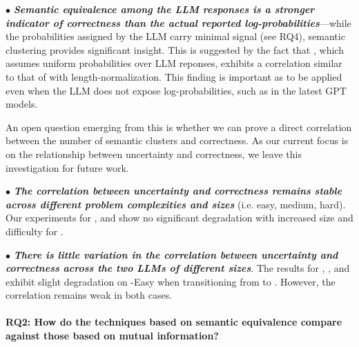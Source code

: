 $\bullet$ \emph{\textbf{Semantic equivalence among the LLM responses is a stronger indicator of correctness than the actual reported log-probabilities}}---while the probabilities assigned by the LLM carry minimal signal (see RQ4), semantic clustering provides significant insight. This is suggested by the fact that \SESymbolicUnif, which assumes uniform probabilities over LLM reponses, exhibits a correlation similar to that of \SESymbolic with length-normalization.
%
This finding is important as \SESymbolicUnif to be applied even when the LLM does not expose log-probabilities, such as in the latest GPT models.

An open question emerging from this is whether we can prove a direct correlation between the number of semantic clusters and correctness. As our current focus is on the relationship between uncertainty and correctness, we leave this investigation for future work.

$\bullet$ \emph{\textbf{The correlation between uncertainty and correctness remains stable across different problem complexities and sizes}} (i.e. easy, medium, hard). Our experiments for \SESymbolic, \SESymbolicUnif and \MISymbolic show no significant degradation with increased size and difficulty for \gptturbo.

$\bullet$ \emph{\textbf{There is little variation in the correlation between uncertainty and correctness across the two LLMs of different sizes}}. The results for \SESymbolic, \SESymbolicUnif, and \MISymbolic exhibit slight degradation on \livecodebench-Easy when transitioning from \gptturbo to \codegenmonoC.  However, the correlation remains weak in both cases.



\paragraph{RQ2: How do the techniques based on semantic equivalence compare against those based on mutual information?}


